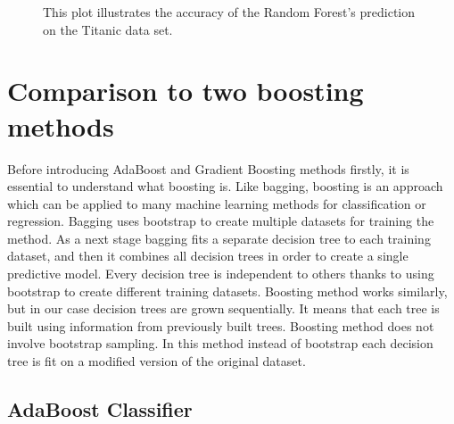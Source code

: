 \begin{figure}[H]
    \captionsetup{format=plain}
    \caption
        {This plot illustrates the accuracy of the Random Forest's prediction on the Titanic data set.
        }
    \label{fig:confusion_matrix}
\end{figure}


\section{Comparison to two boosting methods}
Before introducing AdaBoost and Gradient Boosting methods firstly, it is essential to understand what boosting is. Like bagging, boosting is an approach which can be applied to many machine learning methods for classification or regression. Bagging uses bootstrap to create multiple datasets for training the method. As a next stage bagging fits a separate decision tree to each training dataset, and then it combines all decision trees in order to create a single predictive model. Every decision tree is independent to others thanks to using bootstrap to create different training datasets. Boosting method works similarly, but in our case decision trees are grown sequentially. It means that each tree is built using information from previously built trees. Boosting method does not involve bootstrap sampling. In this method instead of bootstrap each decision tree is fit on a modified version of the original dataset.

\subsection{AdaBoost Classifier}
\label{sec:adaboost}


